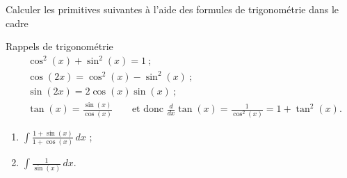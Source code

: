 
\begin{exercice}\label{exoanalyseCTU-0106}

Calculer les primitives suivantes \`a l'aide des formules de trigonométrie dans le cadre

\begin{framed}
Rappels de trigonométrie
  \begin{subequations}
    \begin{align}
      &\cos^2(x) + \sin^2(x)= 1\: ; \\
      &\cos(2x) = \cos^2(x) - \sin^2(x)\: ;  \\
      &\sin(2x) = 2\cos(x)\sin(x)\: ;  \\
      &\tan(x) = \frac{\sin(x)}{\cos(x)} \qquad\text{et donc } \frac{d}{dx}\tan(x) = \frac{1}{\cos^2(x)} = 1+\tan^2(x). 
    \end{align}
  \end{subequations}
\end{framed}


\begin{multicols}{2}
  \begin{enumerate}
  \item $\displaystyle \int \frac{1+\sin(x)}{1+\cos(x)}\, dx$ ;
  \item $\displaystyle \int \frac{1}{\sin(x)}\, dx$.
  \end{enumerate}
\end{multicols}

\end{exercice}

